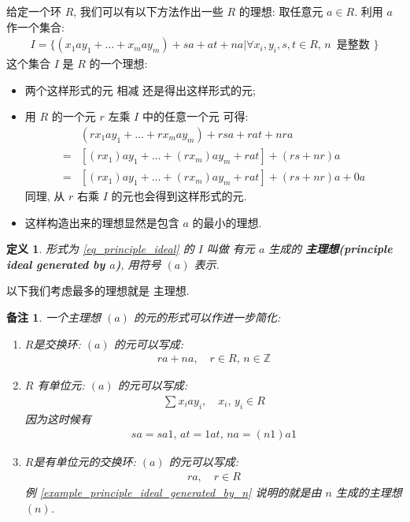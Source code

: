 \documentclass[utf8]{ctexbook}
\newtheorem{definition}{定义}[section]
\newtheorem{memo}{备注}[section]
\begin{document}
给定一个环 $R$, 我们可以有以下方法作出一些 $R$ 的理想: 取任意元 $a \in R$. 利用 $a$ 作一个集合:
\begin{align}
I = \big\{ (x_1 a y_1 + \ldots + x_m a y_m)  + sa + at + n a | \forall x_i, y_i, s, t \in R, \, n \, \mbox{ 是整数 } \big\} \label{eq_principle_ideal}
\end{align}
这个集合 $I$ 是 $R$ 的一个理想:
\begin{itemize}
\item{两个这样形式的元 相减 还是得出这样形式的元;}
\item{用 $R$ 的一个元 $r$ 左乘 $I$ 中的任意一个元 可得:
\begin{align*}
& (r x_1 a y_1 + \ldots + r x_m a y_m)  +  r sa + rat + n r a  \\
=& [(r x_1) a y_1 + \ldots + (r x_m) a y_m + rat ] +  (r s + n r ) a \\
=&   [(r x_1) a y_1 + \ldots + (r x_m) a y_m + rat ] +  (r s + n r ) a  + 0 a
\end{align*}
同理, 从 $r$ 右乘 $I$ 的元也会得到这样形式的元.
}
\item{这样构造出来的理想显然是包含 $a$ 的最小的理想. }
\end{itemize}

\begin{definition}\label{def_principle_ideal}
形式为 \ref{eq_principle_ideal} 的 $I$ 叫做 有元 $a$ 生成的 \textbf{主理想(principle ideal generated by $a$)}, 用符号 $(a)$ 表示.
\end{definition}

以下我们考虑最多的理想就是 主理想.

\begin{memo}\label{memo_ideal_formats}
一个主理想 $(a)$ 的元的形式可以作进一步简化:
\begin{enumerate}
\item{$R$是交换环: $(a)$ 的元可以写成:
\begin{align*}
ra + na , \quad  r \in R, \, n \in \mathbb{Z}
\end{align*}
}
\item{$R$ 有单位元: $(a)$ 的元可以写成:
\begin{align*}
\sum x_i a y_i, \quad  x_i, \, y_i \in R
\end{align*}
因为这时候有
\begin{align*}
sa = sa 1, \, at = 1 at, \, na = (n1) a 1
\end{align*}
}
\item{\label{item_ideal_format_3}$R$是有单位元的交换环: $(a)$ 的元可以写成:
\begin{align*}
ra , \quad  r \in R
\end{align*}
例 \ref{example_principle_ideal_generated_by_n} 说明的就是由 $n$ 生成的主理想 $(n)$.
}
\end{enumerate}
\end{memo}
\end{document}

